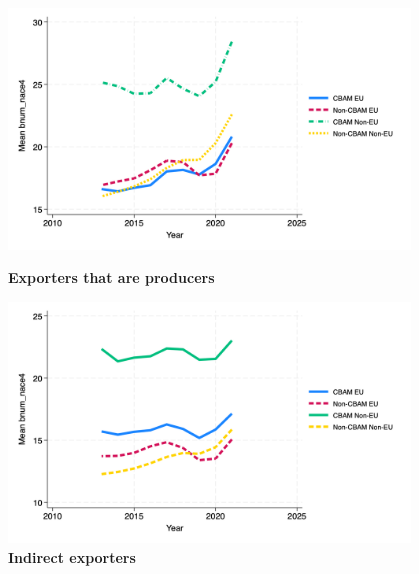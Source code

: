 \documentclass{article}
\begin{document}
\begin{figure}[H]
\centering
\includegraphics[width=0.95\textwidth]{bnum_nace4_ep.png}
\caption{\textbf{Exporters that are producers}}
\includegraphics[width=0.95\textwidth]{bnum_nace4_indir.png}
\caption{\textbf{Indirect exporters}}
\end{figure}
\end{document}
